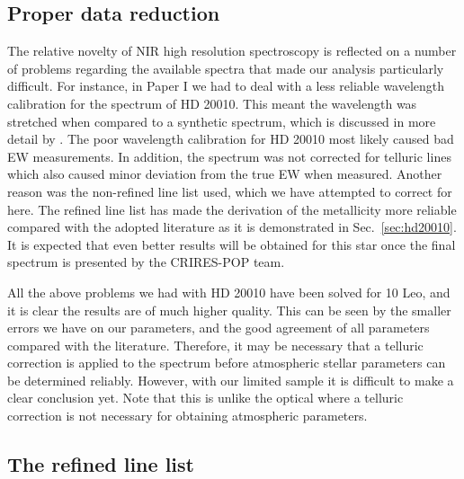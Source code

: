 \documentclass{aa}
\begin{document}
\subsection{Proper data reduction}

The relative novelty of NIR high resolution spectroscopy is reflected on a
number of problems regarding the available spectra that made our analysis
particularly difficult. For instance, in Paper I we had to deal with a less
reliable wavelength calibration for the spectrum of HD 20010. This meant the
wavelength was stretched when compared to a synthetic spectrum, which is
discussed in more detail by \citet{Nicholls2017}. The poor wavelength
calibration for HD 20010 most likely caused bad EW measurements. In addition,
the spectrum was not corrected for telluric lines which also caused minor
deviation from the true EW when measured. Another reason was the non-refined
line list used, which we have attempted to correct for here. The refined line
list has made the derivation of the metallicity more reliable compared with the
adopted literature as it is demonstrated in Sec.~\ref{sec:hd20010}. It is
expected that even better results will be obtained for this star once the final
spectrum is presented by the CRIRES-POP team.

All the above problems we had with HD 20010 have been solved for 10 Leo, and it
is clear the results are of much higher quality. This can be seen by the smaller
errors we have on our parameters, and the good agreement of all parameters
compared with the literature. Therefore, it may be necessary that a telluric
correction is applied to the spectrum before atmospheric stellar parameters can
be determined reliably. However, with our limited sample it is difficult to make
a clear conclusion yet. Note that this is unlike the optical where a telluric
correction is not necessary for obtaining atmospheric parameters.


\subsection{The refined line list}
\end{document}
